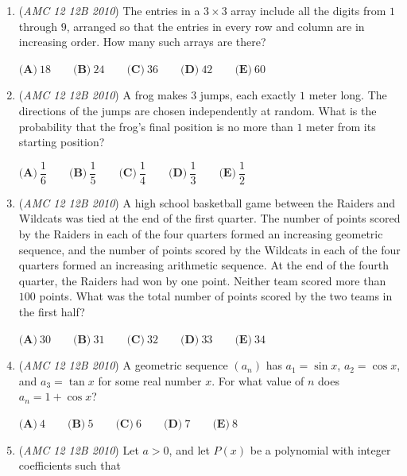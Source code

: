 \begin{enumerate}
 $\textbf{(A)}\ \dfrac{1}{3} \qquad \textbf{(B)}\ \dfrac{29}{81} \qquad \textbf{(C)}\ \dfrac{31}{81} \qquad \textbf{(D)}\ \dfrac{11}{27} \qquad \textbf{(E)}\ \dfrac{13}{27}$


	\item (\textit{AMC 12 12B 2010}) The entries in a $3 \times 3$ array include all the digits from $1$ through $9$, arranged so that the entries in every row and column are in increasing order. How many such arrays are there?


 $\textbf{(A)}\ 18 \qquad \textbf{(B)}\ 24 \qquad \textbf{(C)}\ 36 \qquad \textbf{(D)}\ 42 \qquad \textbf{(E)}\ 60$


	\item (\textit{AMC 12 12B 2010}) A frog makes $3$ jumps, each exactly $1$ meter long. The directions of the jumps are chosen independently at random. What is the probability that the frog's final position is no more than $1$ meter from its starting position?


 $\textbf{(A)}\ \dfrac{1}{6} \qquad \textbf{(B)}\ \dfrac{1}{5} \qquad \textbf{(C)}\ \dfrac{1}{4} \qquad \textbf{(D)}\ \dfrac{1}{3} \qquad \textbf{(E)}\ \dfrac{1}{2}$


	\item (\textit{AMC 12 12B 2010}) A high school basketball game between the Raiders and Wildcats was tied at the end of the first quarter. The number of points scored by the Raiders in each of the four quarters formed an increasing geometric sequence, and the number of points scored by the Wildcats in each of the four quarters formed an increasing arithmetic sequence. At the end of the fourth quarter, the Raiders had won by one point. Neither team scored more than $100$ points. What was the total number of points scored by the two teams in the first half?


 $\textbf{(A)}\ 30 \qquad \textbf{(B)}\ 31 \qquad \textbf{(C)}\ 32 \qquad \textbf{(D)}\ 33 \qquad \textbf{(E)}\ 34$


	\item (\textit{AMC 12 12B 2010}) A geometric sequence $(a_n)$ has $a_1=\sin x$, $a_2=\cos x$, and $a_3= \tan x$ for some real number $x$. For what value of $n$ does $a_n=1+\cos x$?


 

$\textbf{(A)}\ 4 \qquad \textbf{(B)}\ 5 \qquad \textbf{(C)}\ 6 \qquad \textbf{(D)}\ 7 \qquad \textbf{(E)}\ 8$


	\item (\textit{AMC 12 12B 2010}) Let $a > 0$, and let $P(x)$ be a polynomial with integer coefficients such that



\end{enumerate}
